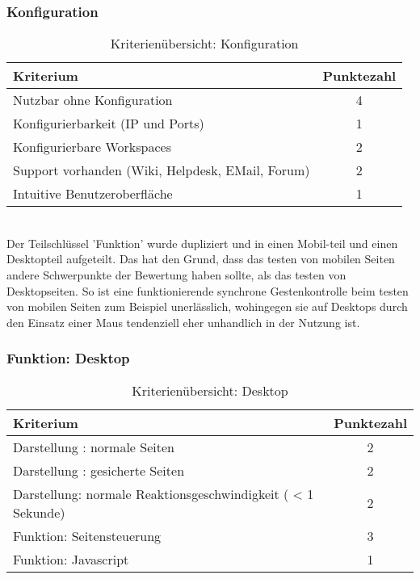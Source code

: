 \subsubsection{Konfiguration}
\begin{table}[H]
 	\vspace{-30pt}
 	\centering
		\begin{tabular}{| p{12cm} | c|}
			\hline
				Kriterium		 &	Punktezahl\\
			\hline
			\hline
				Nutzbar ohne Konfiguration			&4\\
				Konfigurierbarkeit (IP und Ports)			&	1	\\
				Konfigurierbare Workspaces			&	2	\\
				Support vorhanden (Wiki, Helpdesk, EMail, Forum)				&	2	\\
				Intuitive Benutzeroberfläche			&	1	\\
				\hline
		\end{tabular}
	\caption{Kriterienübersicht: Konfiguration}
\end{table}

\\Der Teilschlüssel 'Funktion' wurde dupliziert und in einen Mobil-teil und einen Desktopteil aufgeteilt. Das hat den Grund, dass das testen von mobilen Seiten \mbox{andere} Schwerpunkte der Bewertung haben sollte, als das testen von \mbox{Desktopseiten}. So ist eine funktionierende synchrone Gestenkontrolle beim testen von mobilen Seiten zum Beispiel unerlässlich, wohingegen sie auf Desktops durch den Einsatz einer Maus tendenziell eher unhandlich in der Nutzung ist.
\subsubsection{Funktion: Desktop}
\begin{table}[H]
 	\vspace{-30pt}
 	\centering
		\begin{tabular}{| p{12cm} | c|}
			\hline
				Kriterium		 &	Punktezahl\\
			\hline
			\hline
				Darstellung : normale Seiten			&2\\
				Darstellung : gesicherte Seiten		&	2	\\
				 Darstellung: normale Reaktionsgeschwindigkeit ( < 1 Sekunde)	&	2	\\
				Funktion: Seitensteuerung			&	3	\\
				Funktion: Javascript			&	1	\\
				\hline
		\end{tabular}
	\caption{Kriterienübersicht: Desktop}
\end{table}

